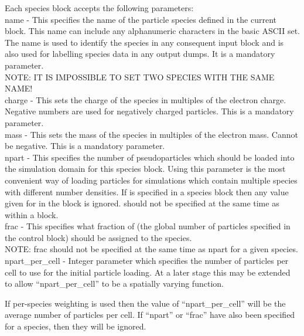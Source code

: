 Each species block accepts the following parameters:\\

{\emphtext name} - This specifies the name of the particle species defined
in the current block. This name can include any alphanumeric characters in
the basic ASCII set. The name is used to identify the species in any
consequent input block and is also used for labelling species data in any
output dumps. It is a mandatory parameter.\\

{\emphtext NOTE: IT IS IMPOSSIBLE TO SET TWO SPECIES WITH THE SAME NAME!} \\

{\emphtext charge} - This sets the charge of the species in
multiples of the electron charge. Negative numbers are used for negatively
charged particles. This is a mandatory parameter.\\

{\emphtext mass} - This sets the mass of the species in multiples
of the electron mass. Cannot be negative. This is a mandatory parameter.\\

{\emphtext npart} - This specifies the number of pseudoparticles
which should be loaded into the simulation domain for this species block.
Using this parameter is the most convenient way of loading particles for
simulations which contain multiple species with different number densities.
If  is specified in a species block then any value
given for  in the  block is ignored.
 should not be specified at the same time
as  within a  block.\\

{\emphtext frac} - This specifies what fraction of  (the
global number of particles specified in the control block) should be assigned
to the species.\\

{\emphtext NOTE: frac should not be specified at the same time as npart for a
given species.}\\

{\emphtext npart\_per\_cell} - Integer parameter which specifies
the number of particles per cell to use for the initial particle loading.
At a later stage this may be extended to allow ``npart\_per\_cell'' to be
a spatially varying function.

If per-species weighting is used then the value of ``npart\_per\_cell'' will
be the average number of particles per cell.  If ``npart'' or ``frac'' have
also been specified for a species, then they will be ignored.

